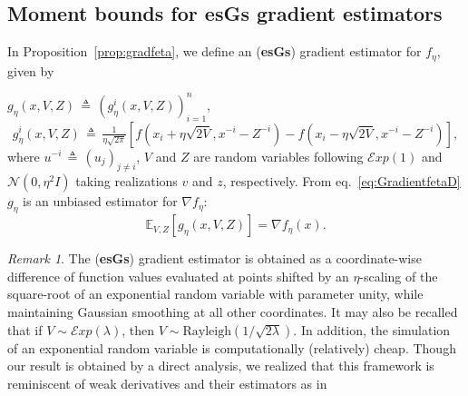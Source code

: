 \documentclass[11pt,reqno]{amsart}
\newcommand{\1}{{\bf 1}}
\newcommand{\2}{{\bf 2}}
\newcommand{\ce}{\mathcal E}
\numberwithin{equation}{section}
\theoremstyle{remark}
\newtheorem{remark}{Remark}[section]
\begin{document}
		
		\subsection{Moment bounds for {\bf esGs} gradient estimators}\label{sec:esGsestimator}
		In Proposition~\ref{prop:gradfeta}, we define an  ({\bf esGs}) gradient estimator for $f_{\eta}$, given by {$g_{\eta}{(x,V,Z)} \, \triangleq \, (g_{\eta}^i{(x,V,Z)})_{i=1}^n$, 
			\begin{equation}\label{eq:g_eta}
				g_{\eta}^i{(x,V,Z)} \, \triangleq \, \tfrac{1}{\eta\sqrt{2\pi}}\left[f\left(x_i+\eta\sqrt{2V},x^{-i}-Z^{-i}\right)-f{\left(x_i-\eta\sqrt{2V},x^{-i}-Z^{-i}\right)}\right],
			\end{equation}
			where $u^{-i} \, \triangleq \, (u_j)_{j \ne i}$, 
			$V$ and $Z$ are random variables following $\mathcal{E}{ xp}(1)$ and
			$\mathcal{N}(0,\eta^2I)$ taking realizations $v$ and $z$, respectively. 
			From eq.~\eqref{eq:GradientfetaD} $g_{\eta}$ is an unbiased estimator for $\nabla f_{\eta}$:
			\begin{equation}\label{eq:unbiased-0}\mathbb{E}_{V,Z}\left[{g}_\eta(x,V,Z)\right]=\nabla f_\eta (x).
			\end{equation}
			\begin{remark}
				The ({\bf esGs}) gradient estimator is obtained as a coordinate-wise difference of function values evaluated at points shifted by an {${\eta}$-}scaling of the square-root of an exponential random variable with parameter unity, while maintaining Gaussian smoothing at all other coordinates. It may also be recalled that if $V \sim {\ce}xp(\lambda)$, then $V \sim \mbox{Rayleigh}(1/\sqrt{2\lambda}).$ In addition, the simulation of an exponential random variable is computationally (relatively)  cheap.  
				Though our result is obtained by a direct analysis, we realized that this framework %
				is reminiscent of weak derivatives and their estimators as in

\end{remark}}
\end{document}
